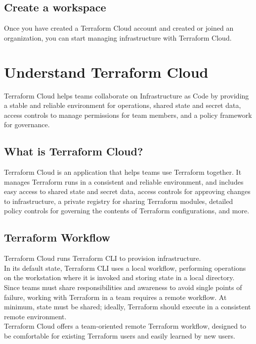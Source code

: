 \documentclass[12pt, letterpaper, twoside]{article}
\begin{document}
\subsection{Create a workspace}
Once you have created a Terraform Cloud account and created or joined an organization, you can start 
managing infrastructure with Terraform Cloud.\\

\section{Understand Terraform Cloud}
Terraform Cloud helps teams collaborate on Infrastructure as Code by providing a stable and reliable 
environment for operations, shared state and secret data, access controls to manage permissions for 
team members, and a policy framework for governance.

\subsection{What is Terraform Cloud?}
Terraform Cloud is an application that helps teams use Terraform together. It manages Terraform runs 
in a consistent and reliable environment, and includes easy access to shared state and secret data, 
access controls for approving changes to infrastructure, a private registry for sharing Terraform 
modules, detailed policy controls for governing the contents of Terraform configurations, and more.

\subsection{Terraform Workflow}
Terraform Cloud runs Terraform CLI to provision infrastructure.\\

In its default state, Terraform CLI uses a local workflow, performing operations on the workstation 
where it is invoked and storing state in a local directory.\\

Since teams must share responsibilities and awareness to avoid single points of failure, working 
with Terraform in a team requires a remote workflow. At minimum, state must be shared; ideally, 
Terraform should execute in a consistent remote environment.\\
Terraform Cloud offers a team-oriented remote Terraform workflow, designed to be comfortable for 
existing Terraform users and easily learned by new users.
\end{document}
